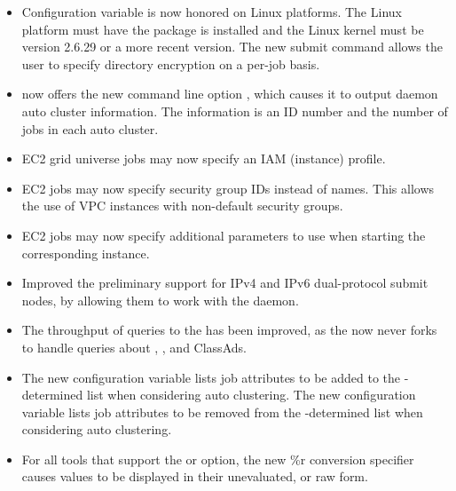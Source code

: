 \begin{itemize}

\item Configuration variable  
is now honored on Linux platforms.
The Linux platform must have the   package is installed
and the Linux kernel must be version 2.6.29 or a more recent version.
The new submit command  allows the user
to specify directory encryption on a per-job basis.

\item {} now offers the new command line option , 
which causes it to output  daemon auto cluster information. 
The information is an ID number and the number of jobs in each auto cluster.

\item EC2 grid universe jobs may now specify an IAM (instance) profile.

\item EC2 jobs may now specify security group IDs instead of names.
This allows the use of VPC instances with non-default security groups.

\item EC2 jobs may now specify additional parameters to use when starting
the corresponding instance.

\item Improved the preliminary support for IPv4 and IPv6 dual-protocol
submit nodes,
by allowing them to work with the  daemon.

\item The throughput of queries to the  has been
improved, as the  now never forks to handle queries 
about , , and 
ClassAds.

\item The new configuration variable 
lists job attributes to be added to the -determined list
when considering auto clustering.
The new configuration variable 
lists job attributes to be removed from the -determined 
list when considering auto clustering.

\item For all tools that support the  or  option,
the new \%r conversion specifier causes values to be displayed 
in their unevaluated, or raw form.


\end{itemize}
